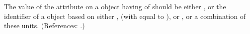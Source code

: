 The value of the attribute  on a \Compartment object having
 of  should be either 
, or the identifier of a \UnitDefinition object based on either
,  (with  equal to ), or
, or a combination of these units.  (References: .)
